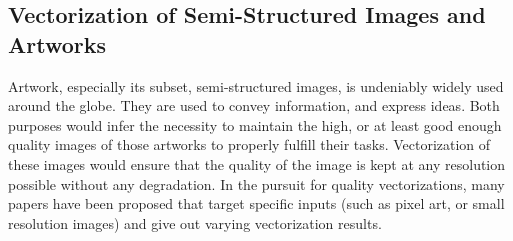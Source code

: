 \subsection{Vectorization of Semi-Structured Images and Artworks}
Artwork, especially its subset, semi-structured images, is undeniably widely used around the globe. They are used to convey information, and express ideas. Both purposes would infer the necessity to maintain the high, or at least good enough quality images of those artworks to properly fulfill their tasks. Vectorization of these images would ensure that the quality of the image is kept at any resolution possible without any degradation. In the pursuit for quality vectorizations, many papers have been proposed that target specific inputs (such as pixel art, or small resolution images) and give out varying vectorization results.

